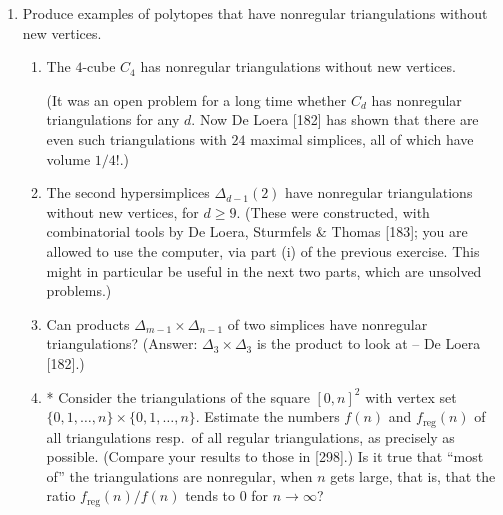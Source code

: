 \documentclass{article}
\begin{document}
\begin{enumerate}
\begin{solution}
\begin{enumerate}[label=(\roman*)]
    \item Just move $\bi{y}_F$ to infinity and the result follows.

    \item Similar to earlier (by using part (ii)) we are looking for a valid set of $x_{d+1}$ components for each vertex, which raises the polytope of the $d$-diagram $Q$ to a $d+1$-polytope $P$. The constraints are again the $k$-faces. Additionally here we have to determine a viewpoint $\bi{y}_F$
\end{enumerate}
\end{solution}

\item Produce examples of polytopes that have nonregular triangulations without new vertices.

\begin{enumerate}[label=(\roman*)]
\item The $4$-cube $C_4$ has nonregular triangulations without new vertices. 

(It was an open problem for a long time whether $C_d$ has nonregular triangulations for any $d$. Now De Loera [182] has shown that there are even such triangulations with $24$ maximal simplices, all of which have volume $1/4!$.)

\item The second hypersimplices $\Delta_{d-1}(2)$ have nonregular triangulations without new vertices, for $d\ge 9$. (These were constructed, with combinatorial tools by De Loera, Sturmfels \& Thomas [183]; you are allowed to use the computer, via part (i) of the previous exercise. This might in particular be useful in the next two parts, which are unsolved problems.)

\item Can products $\Delta_{m-1}\times\Delta_{n-1}$ of two simplices have nonregular triangulations? (Answer: $\Delta_3\times\Delta_3$ is the product to look at -- De Loera [182].)

\item* Consider the triangulations of the square $[0,n]^2$ with vertex set $\{0,1,\ldots,n\}\times\{0,1,\ldots,n\}$. Estimate the numbers $f(n)$ and $f_{\mathrm{reg}}(n)$ of all triangulations resp.\ of all regular triangulations, as precisely as possible. (Compare your results to those in [298].) Is it true that ``most of'' the triangulations are nonregular, when $n$ gets large, that is, that the ratio $f_{\mathrm{reg}}(n)/f(n)$ tends to $0$ for $n\to\infty$?
\end{enumerate}


\end{enumerate}
\end{document}
